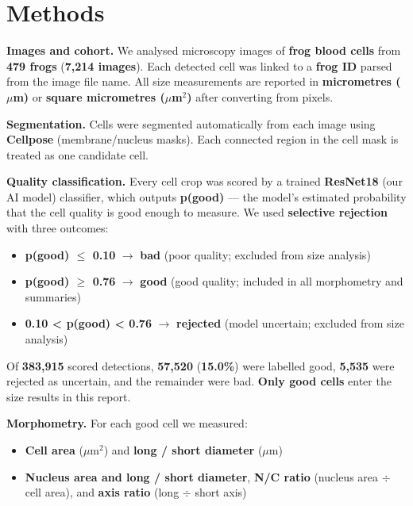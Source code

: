\documentclass[
  english,
]{article}
\providecommand{\tightlist}{%
  \setlength{\itemsep}{0pt}\setlength{\parskip}{0pt}}
\begin{document}
\section{Methods}\label{methods}

\textbf{Images and cohort.} We analysed microscopy images of
\textbf{frog blood cells} from \textbf{479 frogs} (\textbf{7,214
images}). Each detected cell was linked to a \textbf{frog ID} parsed
from the image file name. All size measurements are reported in
\textbf{micrometres (\(\mu\)m)} or \textbf{square micrometres
(\(\mu\)m\(^2\))} after converting from pixels.

\textbf{Segmentation.} Cells were segmented automatically from each
image using \textbf{Cellpose} (membrane/nucleus masks). Each connected
region in the cell mask is treated as one candidate cell.

\textbf{Quality classification.} Every cell crop was scored by a trained
\textbf{ResNet18} (our AI model) classifier, which outputs
\textbf{p(good)} --- the model's estimated probability that the cell
quality is good enough to measure. We used \textbf{selective rejection}
with three outcomes:

\begin{keystats}
\begin{itemize}
\tightlist
\item
  \textbf{p(good) \(\leq\) 0.10} \(\rightarrow\) \textbf{bad} (poor
  quality; excluded from size analysis)
\item
  \textbf{p(good) \(\geq\) 0.76} \(\rightarrow\) \textbf{good} (good
  quality; included in all morphometry and summaries)
\item
  \textbf{0.10 \textless{} p(good) \textless{} 0.76} \(\rightarrow\)
  \textbf{rejected} (model uncertain; excluded from size analysis)
\end{itemize}
\end{keystats}

Of \textbf{383,915} scored detections, \textbf{57,520} (\textbf{15.0\%})
were labelled good, \textbf{5,535} were rejected as uncertain, and the
remainder were bad. \textbf{Only good cells} enter the size results in
this report.

\textbf{Morphometry.} For each good cell we measured:

\begin{keystats}
\begin{itemize}
\tightlist
\item
  \textbf{Cell area} (\(\mu\)m\(^2\)) and \textbf{long / short diameter}
  (\(\mu\)m)
\item
  \textbf{Nucleus area and long / short diameter}, \textbf{N/C ratio}
  (nucleus area \(\div\) cell area), and \textbf{axis ratio} (long
  \(\div\) short axis)
\end{itemize}
\end{keystats}
\end{document}

